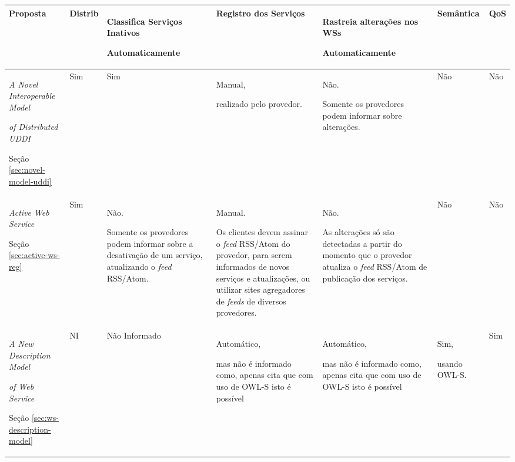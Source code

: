 \begin{center}
{\tiny
  \begin{tabular}{|p{2.5cm}|p{0.6cm}|p{2.5cm}|p{2.9cm}|p{3.5cm}|p{1.5cm}|p{0.4cm}|} %
  \hline
	\textbf{Proposta} &\textbf{Distrib} &\textbf{Classifica Serviços Inativos}\par \textbf{Automaticamente} & 
	\textbf{Registro dos Serviços} &\textbf{Rastreia alterações nos WSs}\par \textbf{Automaticamente} &
	\textbf{Semântica} & \textbf{QoS}   \\

   \hline
	\textit{A Novel Interoperable Model}\par \textit{of Distributed UDDI} \cite{wu2008novel}\par Seção \ref{sec:novel-model-uddi} 
	& Sim 
	& Sim & Manual,\par realizado pelo provedor. 
	& Não.\par Somente os provedores podem informar sobre alterações. 
	& Não & Não\\

    \hline
	\textit{Active Web Service} \cite{treiber2007active}\par Seção \ref{sec:active-ws-reg} 
	& Sim 
	& Não.\par Somente os provedores podem informar sobre a desativação de um serviço, atualizando o \textit{feed} RSS/Atom.  
	& Manual.\par Os clientes devem assinar o \textit{feed} RSS/Atom do provedor, 
	para serem informados de novos serviços e atualizações,
	ou utilizar sites agregadores de \textit{feeds} de diversos provedores. 
	& Não.\par As alterações só são detectadas a partir do momento que o provedor 
	atualiza o \textit{feed} RSS/Atom de publicação dos serviços. 
	& Não & Não\\

    \hline
	 \textit{A New Description Model}\par \textit{of Web Service} \cite{wu2009new}\par Seção \ref{sec:ws-description-model}  
	& NI 
	& Não Informado 
	& Automático,\par mas não é informado como, apenas cita que com uso de OWL-S isto é possível 
	& Automático,\par mas não é informado como, apenas cita que com uso de OWL-S isto é possível 
	& Sim,\par usando OWL-S. & Sim\\


\end{tabular}}
\end{center}
